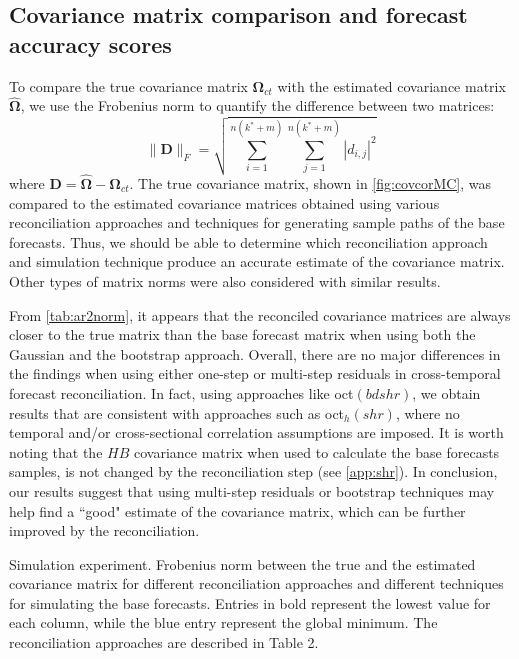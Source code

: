 \documentclass[a4paper,11pt]{article}
\newcommand{\Dvet}{\bm{D}}
\newcommand{\Omegavet}{\bm{\Omega}}
\theoremstyle{definition}
\begin{document}
\subsection{Covariance matrix comparison and forecast accuracy scores}\label{ssec:acc_scores}

To compare the true covariance matrix $\Omegavet_{ct}$ with the estimated covariance matrix $\widehat{\Omegavet}$, we use the Frobenius norm to quantify the difference between two matrices: 
$$\lVert \Dvet \rVert_F = \displaystyle\sqrt{\sum_{i = 1}^{n(k^\ast + m)}\sum_{j = 1}^{n(k^\ast + m)}|d_{i,j}|^2}$$ where $\Dvet = \widehat{\Omegavet} - \Omegavet_{ct}$. The true covariance matrix, shown in \autoref{fig:covcorMC}, was compared to the estimated covariance matrices obtained using various reconciliation approaches and techniques for generating sample paths of the base forecasts. Thus, we should be able to determine which reconciliation approach and simulation technique produce an accurate estimate of the covariance matrix. Other types of matrix norms were also considered with similar results.

From \autoref{tab:ar2norm}, it appears that the reconciled covariance matrices are always closer to the true matrix than the base forecast matrix when using both the Gaussian and the bootstrap  approach. Overall, there are no major differences in the findings when using either one-step or multi-step residuals in cross-temporal forecast reconciliation. In fact, using approaches like oct$(bdshr)$, we obtain results that are consistent with approaches such as oct$_h(shr)$, where no temporal and/or cross-sectional correlation assumptions are imposed. It is worth noting that the $HB$ covariance matrix when used to calculate the base forecasts samples, is not changed by the reconciliation step (see \autoref{app:shr}). In conclusion, our results suggest that using multi-step residuals or bootstrap techniques may help find a “good" estimate of the covariance matrix, which can be further improved by the reconciliation.

\begin{table}[!t]
	\centering
	\begingroup
	\fontsize{9}{11}\selectfont
	
	\endgroup
	\caption{Simulation experiment. Frobenius norm between the true and the estimated covariance matrix for different reconciliation approaches and different techniques for simulating the base forecasts. Entries in bold represent the lowest value for each column, while the blue entry represent the global minimum. The reconciliation approaches are described in Table 2.}
	\label{tab:ar2norm}
\end{table}
\end{document}
